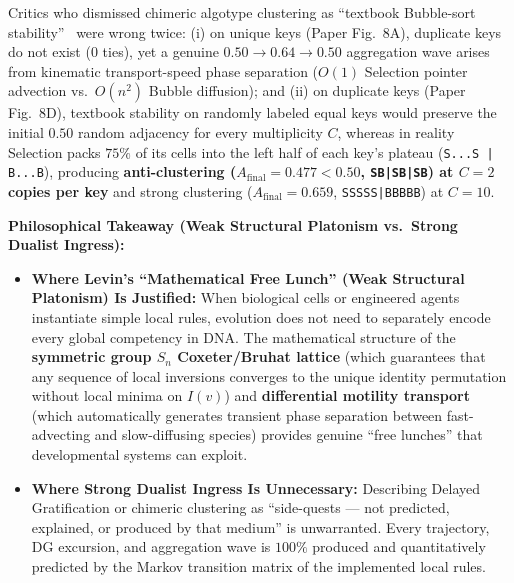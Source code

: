 \documentclass[11pt,a4paper]{article}
\theoremstyle{definition}
\theoremstyle{remark}
\newcommand{\DG}{\mathrm{DG}}
\begin{document}
\begin{enumerate}
  Critics who dismissed chimeric algotype clustering as ``textbook Bubble-sort stability''~\cite{Sweet2026} were wrong twice: (i) on unique keys (Paper Fig.~8A), duplicate keys do not exist ($0$ ties), yet a genuine $0.50 \to 0.64 \to 0.50$ aggregation wave arises from kinematic transport-speed phase separation ($O(1)$ Selection pointer advection vs.\ $O(n^2)$ Bubble diffusion); and (ii) on duplicate keys (Paper Fig.~8D), textbook stability on randomly labeled equal keys would preserve the initial $0.50$ random adjacency for every multiplicity $C$, whereas in reality Selection packs $75\%$ of its cells into the left half of each key's plateau (\texttt{S...S | B...B}), producing \textbf{anti-clustering ($A_{\mathrm{final}} = 0.477 < 0.50$, \texttt{SB|SB|SB}) at $C = 2$ copies per key} and strong clustering ($A_{\mathrm{final}} = 0.659$, \texttt{SSSSS|BBBBB}) at $C = 10$.
\end{enumerate}

\noindent\textbf{Philosophical Takeaway (Weak Structural Platonism vs.\ Strong Dualist Ingress):}
\begin{itemize}
  \item \textbf{Where Levin's ``Mathematical Free Lunch'' (Weak Structural Platonism) Is Justified:} When biological cells or engineered agents instantiate simple local rules, evolution does not need to separately encode every global competency in DNA. The mathematical structure of the \textbf{symmetric group $S_n$ Coxeter/Bruhat lattice} (which guarantees that any sequence of local inversions converges to the unique identity permutation without local minima on $I(v)$) and \textbf{differential motility transport} (which automatically generates transient phase separation between fast-advecting and slow-diffusing species) provides genuine ``free lunches'' that developmental systems can exploit.
  \item \textbf{Where Strong Dualist Ingress Is Unnecessary:} Describing Delayed Gratification or chimeric clustering as ``side-quests --- not predicted, explained, or produced by that medium'' is unwarranted. Every trajectory, $\DG$ excursion, and aggregation wave is $100\%$ produced and quantitatively predicted by the Markov transition matrix of the implemented local rules.
\end{itemize}
\end{document}
